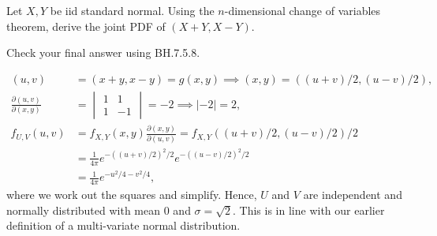 \begin{exercise}
Let $X, Y$ be iid standard normal. Using the $n$-dimensional change of variables theorem, derive the joint PDF of $(X+Y, X-Y)$.

Check your final answer using BH.7.5.8.
\begin{solution}
\begin{align}
(u,v) &= (x+y, x-y) = g(x,y) \implies (x,y) = ((u+v)/2, (u-v)/2), \\
\frac{\partial (u,v)}{\partial (x, y)} &=
  \begin{vmatrix}
    1 & 1 \\
1 & -1
  \end{vmatrix} = -2 \implies |-2| = 2,\\
f_{U,V}(u,v) &= f_{X,Y}(x,y) \frac{\partial(x,y)}{\partial(u,v)} = f_{X,Y}((u+v)/2, (u-v)/2) /2 \\
&= \frac{1}{4\pi} e^{-((u+v)/2)^{2}/2} e^{-((u-v)/2)^{2}/2} \\
&= \frac{1}{4\pi} e^{-u^{2}/4-v^{2}/4},
\end{align}
where we work out the squares and simplify.
Hence, $U$ and $V$ are independent and normally distributed with mean 0 and $\sigma=\sqrt 2$.
This is in line with our earlier definition of a multi-variate normal distribution.
\end{solution}

\end{exercise}


